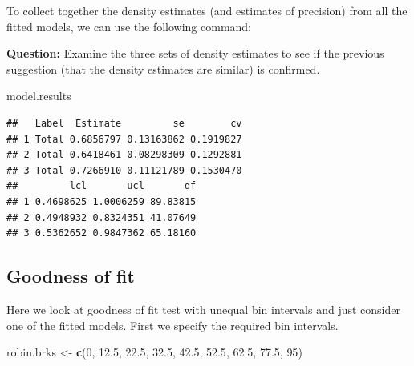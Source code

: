 \documentclass[10pt,a4paper]{tufte-handout}
\newenvironment{Shaded}{\begin{snugshade}}{\end{snugshade}}
\newcommand{\CommentTok}[1]{\textcolor[rgb]{0.56,0.35,0.01}{\textit{#1}}}
\newcommand{\DecValTok}[1]{\textcolor[rgb]{0.00,0.00,0.81}{#1}}
\newcommand{\FloatTok}[1]{\textcolor[rgb]{0.00,0.00,0.81}{#1}}
\newcommand{\KeywordTok}[1]{\textcolor[rgb]{0.13,0.29,0.53}{\textbf{#1}}}
\newcommand{\NormalTok}[1]{#1}
\newcommand{\OperatorTok}[1]{\textcolor[rgb]{0.81,0.36,0.00}{\textbf{#1}}}
\newcommand{\StringTok}[1]{\textcolor[rgb]{0.31,0.60,0.02}{#1}}
\begin{document}
To collect together the density estimates (and estimates of precision)
from all the fitted models, we can use the following command:

\begin{Shaded}
\end{Shaded}

\begin{marginfigure}
\textbf{Question:} Examine the three sets of density estimates to see if
the previous suggestion (that the density estimates are similar) is
confirmed.
\end{marginfigure}

\begin{Shaded}
\begin{Highlighting}[]
\NormalTok{model.results}
\end{Highlighting}
\end{Shaded}

\begin{verbatim}
##   Label  Estimate         se        cv
## 1 Total 0.6856797 0.13163862 0.1919827
## 2 Total 0.6418461 0.08298309 0.1292881
## 3 Total 0.7266910 0.11121789 0.1530470
##         lcl       ucl       df
## 1 0.4698625 1.0006259 89.83815
## 2 0.4948932 0.8324351 41.07649
## 3 0.5362652 0.9847362 65.18160
\end{verbatim}

\hypertarget{goodness-of-fit}{%
\subsection{Goodness of fit}\label{goodness-of-fit}}

Here we look at goodness of fit test with unequal bin intervals and just
consider one of the fitted models. First we specify the required bin
intervals.

\begin{Shaded}
\begin{Highlighting}[]
\NormalTok{robin.brks <-}\StringTok{ }\KeywordTok{c}\NormalTok{(}\DecValTok{0}\NormalTok{, }\FloatTok{12.5}\NormalTok{, }\FloatTok{22.5}\NormalTok{, }\FloatTok{32.5}\NormalTok{, }\FloatTok{42.5}\NormalTok{, }\FloatTok{52.5}\NormalTok{, }
    \FloatTok{62.5}\NormalTok{, }\FloatTok{77.5}\NormalTok{, }\DecValTok{95}\NormalTok{)}
\end{Highlighting}
\end{Shaded}
\end{document}
